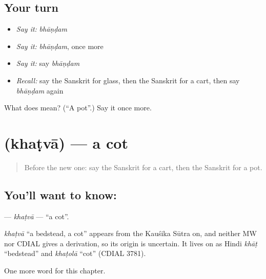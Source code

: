\subsection*{Your turn}
\begin{itemize}
\raggedright
  \item \emph{Say it:} \emph{bhāṇḍam}
  \item \emph{Say it:} \emph{bhāṇḍam}, once more
  \item \emph{Say it:} say \emph{bhāṇḍam}
  \item \emph{Recall:} say the Sanskrit for glass, then the Sanskrit for a cart, then say \emph{bhāṇḍam} again
\end{itemize}

\begin{tcolorbox}[breakable,colback=teal!4,colframe=teal!35!black,title={Before you move on}]
What does  mean? (\textquotedblleft{}A pot\textquotedblright{}.) Say it once more.
\end{tcolorbox}
\section[\texorpdfstring{\sk{खट्वा} (khaṭvā)}{खट्वा (khaṭvā)}]{ (khaṭvā) — a cot}

\label{lesson:SA-C122-khatva}



\begin{quote}
Before the new one: say the Sanskrit for a cart, then the Sanskrit for a pot.
\end{quote}

\subsection*{You'll want to know: }
\textbf{} — \emph{khaṭvā} — \textquotedblleft{}a cot\textquotedblright{}.

\begin{cousinweb}
\emph{khaṭvā} \textquotedblleft{}a bedstead, a cot\textquotedblright{} appears from the Kauśika Sūtra on, and neither MW nor CDIAL gives a derivation, so its origin is uncertain. It lives on as Hindi \emph{khāṭ} \textquotedblleft{}bedstead\textquotedblright{} and \emph{khaṭolā} \textquotedblleft{}cot\textquotedblright{} (CDIAL 3781).
\end{cousinweb}

\begin{grammarlens}[title={What you've built}]
One more word for this chapter.
\end{grammarlens}


